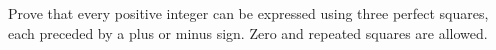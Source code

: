 Prove that every positive integer can be expressed using three perfect squares, each preceded by a plus or minus sign. Zero and repeated squares are allowed.
